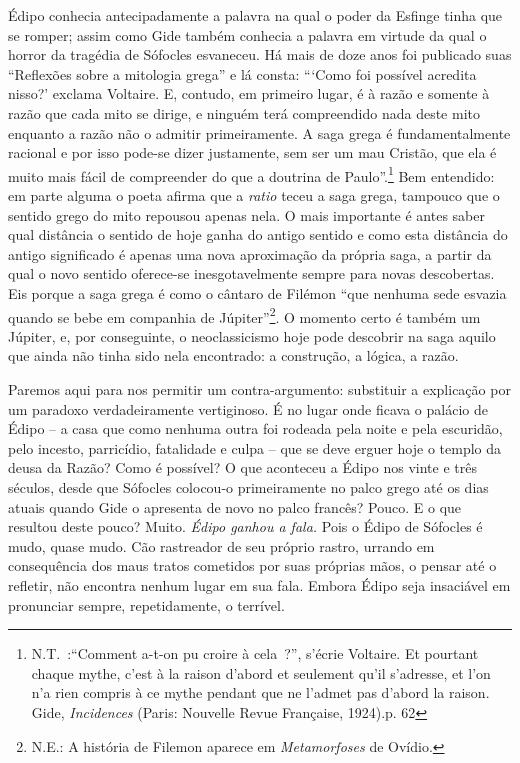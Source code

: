 Édipo conhecia antecipadamente a palavra na qual o poder da Esfinge
tinha que se romper; assim como Gide também conhecia a palavra em
virtude da qual o horror da tragédia de Sófocles esvaneceu. Há mais de
doze anos foi publicado suas ``Reflexões sobre a mitologia grega'' e lá
consta: ```Como foi possível acredita nisso?' exclama Voltaire. E,
contudo, em primeiro lugar, é à razão e somente à razão que cada mito se
dirige, e ninguém terá compreendido nada deste mito enquanto a razão não
o admitir primeiramente. A saga grega é fundamentalmente racional e por
isso pode-se dizer justamente, sem ser um mau Cristão, que ela é muito
mais fácil de compreender do que a doutrina de Paulo''.\footnote{N.T.~:``Comment
  a-t-on pu croire à cela~?'', s'écrie Voltaire. Et pourtant chaque
  mythe, c'est à la raison d'abord et seulement qu'il s'adresse, et l'on
  n'a rien compris à ce mythe pendant que ne l'admet pas d'abord la
  raison. Gide, \emph{Incidences} (Paris: Nouvelle Revue Française,
  1924).p. 62} Bem entendido: em parte alguma o poeta afirma que a
\emph{ratio} teceu a saga grega, tampouco que o sentido grego do mito
repousou apenas nela. O mais importante é antes saber qual distância o
sentido de hoje ganha do antigo sentido e como esta distância do antigo
significado é apenas uma nova aproximação da própria saga, a partir da
qual o novo sentido oferece-se inesgotavelmente sempre para novas
descobertas. Eis porque a saga grega é como o cântaro de Filémon ``que
nenhuma sede esvazia quando se bebe em companhia de Júpiter''\footnote{N.E.:
  A história de Filemon aparece em \emph{Metamorfoses} de Ovídio.}. O
momento certo é também um Júpiter, e, por conseguinte, o neoclassicismo
hoje pode descobrir na saga aquilo que ainda não tinha sido nela
encontrado: a construção, a lógica, a razão.

Paremos aqui para nos permitir um contra-argumento: substituir a
explicação por um paradoxo verdadeiramente vertiginoso. É no lugar onde
ficava o palácio de Édipo -- a casa que como nenhuma outra foi rodeada
pela noite e pela escuridão, pelo incesto, parricídio, fatalidade e
culpa -- que se deve erguer hoje o templo da deusa da Razão? Como é
possível? O que aconteceu a Édipo nos vinte e três séculos, desde que
Sófocles colocou-o primeiramente no palco grego até os dias atuais
quando Gide o apresenta de novo no palco francês? Pouco. E o que
resultou deste pouco? Muito. \emph{Édipo ganhou a fala.} Pois o Édipo de
Sófocles é mudo, quase mudo. Cão rastreador de seu próprio rastro,
urrando em consequência dos maus tratos cometidos por suas próprias
mãos, o pensar até o refletir, não encontra nenhum lugar em sua fala.
Embora Édipo seja insaciável em pronunciar sempre, repetidamente, o
terrível.


